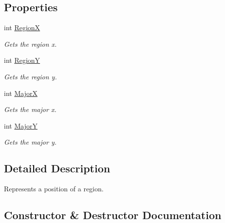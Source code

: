 \subsection*{Properties}
\begin{DoxyCompactItemize}
\item 
int \hyperlink{classCore_1_1Models_1_1RegionPosition_a3558f91a2b72169d93722b9787abdf10}{Region\+X}
\begin{DoxyCompactList}\small\item\em Gets the region x. \end{DoxyCompactList}\item 
int \hyperlink{classCore_1_1Models_1_1RegionPosition_ad6286a611b7ae561ac86a70dc68b10f2}{Region\+Y}
\begin{DoxyCompactList}\small\item\em Gets the region y. \end{DoxyCompactList}\item 
int \hyperlink{classCore_1_1Models_1_1RegionPosition_a98870c2d638d7d399b1ef1a922b91898}{Major\+X}
\begin{DoxyCompactList}\small\item\em Gets the major x. \end{DoxyCompactList}\item 
int \hyperlink{classCore_1_1Models_1_1RegionPosition_a1a50c82dbe48a3fa60df6b9f44a71c2c}{Major\+Y}
\begin{DoxyCompactList}\small\item\em Gets the major y. \end{DoxyCompactList}\end{DoxyCompactItemize}


\subsection{Detailed Description}
Represents a position of a region. 



\subsection{Constructor \& Destructor Documentation}
\hypertarget{classCore_1_1Models_1_1RegionPosition_ae02aba3016ef1e1eca5b3283bbd6068b}{}
